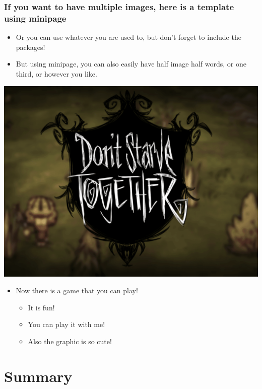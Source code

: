 \documentclass[aspectratio=169]{beamer}
\begin{document}
\begin{frame}[fragile]
	\frametitle{If you want to have multiple images, here is a template using minipage}
	\begin{itemize}
	    \item Or you can use whatever you are used to, but don't forget to include the packages! 
	    \item But using minipage, you can also easily have half image half words, or one third, or however you like.
	\end{itemize}

    \begin{minipage}{.5\textwidth}
      \centering
      \includegraphics[width=0.7\linewidth]{images/dst.png}
    \end{minipage}%
    \begin{minipage}{.5\textwidth}
      \begin{itemize}
          \item Now there is a game that you can play!
          \begin{itemize}
              \item It is fun!
              \item You can play it with me! 
              \item Also the graphic is so cute! 
          \end{itemize}
      \end{itemize}
    \end{minipage}
\end{frame}


\section{Summary}
\subsection{}
\end{document}
